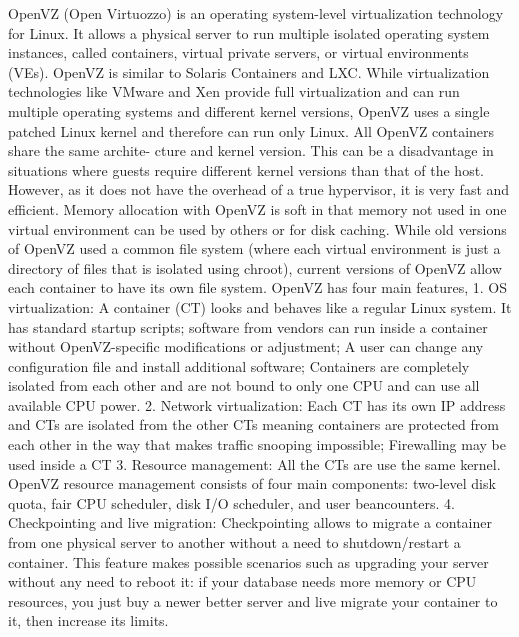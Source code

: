      OpenVZ (Open Virtuozzo) is an operating system-level
     virtualization technology for Linux. It allows a physical server
     to run multiple isolated operating system instances, called
     containers, virtual private servers, or virtual environments
     (VEs). OpenVZ is similar to Solaris Containers and
     LXC. \cite{www-openvz-3} While virtualization technologies like
     VMware and Xen provide full virtualization and can run multiple
     operating systems and different kernel versions, OpenVZ uses a
     single patched Linux kernel and therefore can run only Linux. All
     OpenVZ containers share the same archite- cture and kernel
     version. This can be a disadvantage in situations where guests
     require different kernel versions than that of the host. However,
     as it does not have the overhead of a true hypervisor, it is very
     fast and efficient. Memory allocation with OpenVZ is soft in that
     memory not used in one virtual environment can be used by others
     or for disk caching. \cite{www-openvz-2} While old versions of
     OpenVZ used a common file system (where each virtual environment
     is just a directory of files that is isolated using chroot),
     current versions of OpenVZ allow each container to have its own
     file system.  OpenVZ has four main features, \cite{www-openvz-1}
     1. OS virtualization: A container (CT) looks and behaves like a
     regular Linux system. It has standard startup scripts; software
     from vendors can run inside a container without OpenVZ-specific
     modifications or adjustment; A user can change any configuration
     file and install additional software; Containers are completely
     isolated from each other and are not bound to only one CPU and
     can use all available CPU power.
     2. Network virtualization: Each CT has its own IP address and CTs
     are isolated from the other CTs meaning containers are protected
     from each other in the way that makes traffic snooping
     impossible; Firewalling may be used inside a CT
     3. Resource management: All the CTs are use the same
     kernel. OpenVZ resource management consists of four main
     components: two-level disk quota, fair CPU scheduler, disk I/O
     scheduler, and user beancounters.
     4. Checkpointing and live migration: Checkpointing allows to
     migrate a container from one physical server to another without a
     need to shutdown/restart a container. This feature makes possible
     scenarios such as upgrading your server without any need to
     reboot it: if your database needs more memory or CPU resources,
     you just buy a newer better server and live migrate your
     container to it, then increase its limits.



